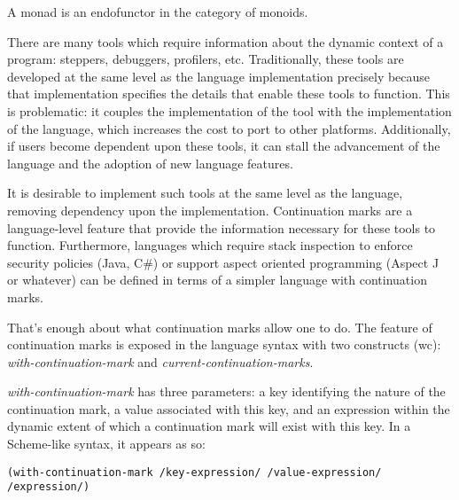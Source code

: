 \documentclass[ms]{byuprop}
\begin{document}

A monad is an endofunctor in the category of monoids.


There are many tools which require information about the dynamic context of a program: steppers, debuggers, profilers, etc. Traditionally, these tools are developed at the same level as the language implementation precisely because that implementation specifies the details that enable these tools to function. This is problematic: it couples the implementation of the tool with the implementation of the language, which increases the cost to port to other platforms. Additionally, if users become dependent upon these tools, it can stall the advancement of the language and the adoption of new language features.

It is desirable to implement such tools at the same level as the 
language, removing dependency upon the implementation. Continuation marks are a language-level feature that provide the information necessary for these tools to function. Furthermore, languages which require stack inspection to enforce security policies (Java, C\#) or support aspect oriented programming (Aspect J or whatever) can be defined in terms of a simpler language with continuation marks.


That's enough about what continuation marks allow one to do. The feature of continuation marks is exposed in the language syntax with two constructs (wc): \emph{with-continuation-mark} and \emph{current-continuation-marks}.

\emph{with-continuation-mark} has three parameters: a key identifying the nature of the continuation mark, a value associated with this key, and an expression within the dynamic extent of which a continuation mark will exist with this key. In a Scheme-like syntax, it appears as so:

\begin{verbatim}
(with-continuation-mark /key-expression/ /value-expression/ /expression/)
\end{verbatim}
\end{document}
